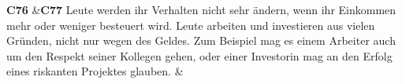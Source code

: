 \documentclass[
		11pt,
		a4paper,
		openright,
		oneside,
		ngerman
	]
	{book}
\begin{document}
\begin{longtabu}[htpb]
\textbf{C76} %
&\textbf{C77} %
		Leute werden ihr Verhalten nicht sehr ändern, wenn ihr Einkommen mehr oder weniger besteuert wird.
		Leute arbeiten und investieren aus vielen Gründen, nicht nur wegen des Geldes.
		Zum Beispiel mag es einem Arbeiter auch um den Respekt seiner Kollegen gehen, oder einer Investorin mag an den Erfolg eines riskanten Projektes glauben.
&%
\\

\end{longtabu}
\end{document}
